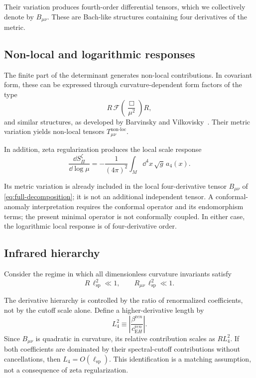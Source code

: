 \documentclass[pdflatex,sn-mathphys-num]{sn-jnl} %
\theoremstyle{remark}
\theoremstyle{plain}
\begin{document}
    Their variation produces fourth-order differential tensors,
    which we collectively denote by $B_{\mu\nu}$.
    These are Bach-like structures containing four derivatives of the metric.

  \subsection{Non-local and logarithmic responses}
    \label{subsec:nonlocal-anomaly}

    The finite part of the determinant generates non-local contributions.
    In covariant form, these can be expressed through curvature-dependent
    form factors of the type
    \begin{equation}
      R \,\mathcal{F}\!\left(\frac{\Box}{\mu^2}\right) R ,
    \end{equation}
    and similar structures, as developed by
    Barvinsky and Vilkovisky~\cite{BarvinskyVilkovisky1985,BarvinskyVilkovisky1990}.
    Their metric variation yields non-local tensors
    $T^{\mathrm{non\mbox{-}loc}}_{\mu\nu}$.

    In addition, zeta regularization produces the local scale response~\cite{BirrellDavies1982,Vassilevich2003}
    \begin{equation}
      \frac{\dd S_\Pi^\zeta}{\dd\log\mu}
      =
      -\frac{1}{(4\pi)^2}
      \int_M\dd^4x\,\sqrt{g}\,a_4(x).
    \end{equation}

    Its metric variation is already included in the local four-derivative tensor $B_{\mu\nu}$ of
    \eqref{eq:full-decomposition}; it is not an additional independent tensor.
    A conformal-anomaly interpretation requires the conformal operator and its endomorphism terms; the present minimal
    operator is not conformally coupled.
    In either case, the logarithmic local response is of four-derivative order.

  \subsection{Infrared hierarchy}
    \label{subsec:ir-hierarchy}

    Consider the regime in which all dimensionless curvature invariants satisfy
    \begin{equation}
      R\,\ell_{\mathrm{sp}}^2 \ll 1,
      \qquad
      R_{\mu\nu}\,\ell_{\mathrm{sp}}^2 \ll 1.
    \end{equation}

    The derivative hierarchy is controlled by the ratio of renormalized coefficients, not by the cutoff scale alone.
    Define a higher-derivative length by
    \begin{equation}
      L_4^2
      \equiv
      \left|\frac{\beta^{\mathrm ren}}{c_{\mathrm EH}^{\mathrm ren}}\right|.
      \label{eq:L4-def}
    \end{equation}
    Since $B_{\mu\nu}$ is quadratic in curvature, its relative contribution scales as $R L_4^2$.
    If both coefficients are dominated by their spectral-cutoff contributions without cancellations, then
    $L_4=O(\ell_{\mathrm{sp}})$.
    This identification is a matching assumption, not a consequence of zeta regularization.
\end{document}
